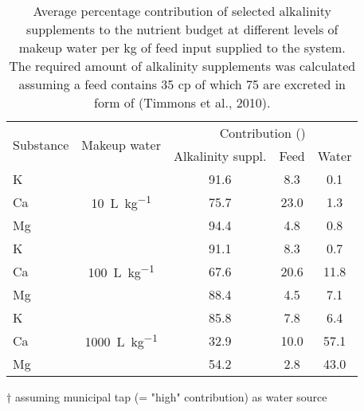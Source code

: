 \begin{table}
\centering
  \begin{threeparttable}
  \caption{Average percentage contribution of selected alkalinity supplements to the nutrient budget at different levels of makeup water per \si{\kg} of feed input supplied to the system. The required amount of alkalinity supplements was calculated assuming a feed contains \SI{35}{\p} \gls{cp} of which \SI{75}{\p} are excreted in form of  (Timmons et al., 2010).}
  \label{tab:alkalinitycont}
    \begin{tabular}{lcccc}

    \toprule

    \multirow{2}{*}{Substance}
    & \multirow{2}{*}{Makeup water}
    & \multicolumn{3}{c}{Contribution (\si{\p})}
    \\

    \addlinespace
    \cmidrule(lr){3-5}
    \addlinespace

    &
    & Alkalinity suppl.
    & Feed
    & Water\tnote{†}
    \\

    \midrule

    K
    & \multirow{3}{*}{\SI{10}{\L\per\kg}}
    & 91.6
    & 8.3
    & 0.1
    \\

    Ca
    &
    & 75.7
    & 23.0
    & 1.3
    \\

    Mg
    &
    & 94.4
    & 4.8
    & 0.8
    \\

    \addlinespace

    K
    & \multirow{3}{*}{\SI{100}{\L\per\kg}}
    & 91.1
    & 8.3
    & 0.7
    \\

    Ca
    &
    & 67.6
    & 20.6
    & 11.8
    \\

    Mg
    &
    & 88.4
    & 4.5
    & 7.1
    \\

    \addlinespace

    K
    & \multirow{3}{*}{\SI{1000}{\L\per\kg}}
    & 85.8
    & 7.8
    & 6.4
    \\

    Ca
    &
    & 32.9
    & 10.0
    & 57.1
    \\

    Mg
    &
    & 54.2
    & 2.8
    & 43.0
    \\

  \bottomrule
  \end{tabular}
    \begin{tablenotes}
      \item[†] assuming municipal tap (= "high" contribution) as water source
    \end{tablenotes}
  \end{threeparttable}
\end{table}

